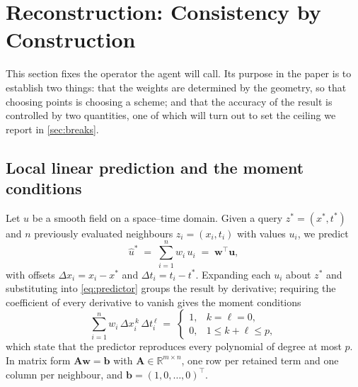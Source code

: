 
\section{Reconstruction: Consistency by Construction}
\label{sec:reconstruction}

This section fixes the operator the agent will call. Its purpose in the paper
is to establish two things: that the weights are determined by the geometry, so
that choosing points is choosing a scheme; and that the accuracy of the result
is controlled by two quantities, one of which will turn out to set the ceiling
we report in \cref{sec:breaks}.

\subsection{Local linear prediction and the moment conditions}
\label{sec:recon_moments}

Let $u$ be a smooth field on a space--time domain. Given a query
$z^{*} = (x^{*}, t^{*})$ and $n$ previously evaluated neighbours
$z_i = (x_i, t_i)$ with values $u_i$, we predict
%
\begin{equation}
  \hat{u}^{*} \;=\; \sum_{i=1}^{n} w_i\,u_i \;=\; \mathbf{w}^{\top}\mathbf{u},
  \label{eq:predictor}
\end{equation}
%
with offsets $\Delta x_i = x_i - x^{*}$ and $\Delta t_i = t_i - t^{*}$.
Expanding each $u_i$ about $z^{*}$ and substituting into
\eqref{eq:predictor} groups the result by derivative; requiring the
coefficient of every derivative to vanish gives the moment conditions
%
\begin{equation}
  \sum_{i=1}^{n} w_i\,\Delta x_i^{\,k}\,\Delta t_i^{\,\ell}
  \;=\;
  \begin{cases}
    1, & k = \ell = 0,\\
    0, & 1 \le k + \ell \le p,
  \end{cases}
  \label{eq:moments}
\end{equation}
%
which state that the predictor reproduces every polynomial of degree at most
$p$. In matrix form $\mathbf{A}\mathbf{w} = \mathbf{b}$ with
$\mathbf{A} \in \mathbb{R}^{m \times n}$, one row per retained term and one
column per neighbour, and $\mathbf{b} = (1,0,\dots,0)^{\top}$.

